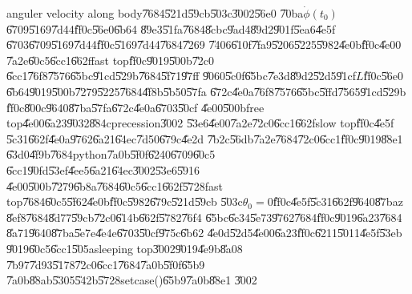 anguler velocity along body\U{7684}\U{521d}\U{59cb}\U{503c}\U{3002}\U{56e0}%
\U{70ba}$\dot{\phi}(t_{0})$\U{6709}\U{5169}\U{7d44}\U{ff0c}\U{56e0}\U{6b64}%
\U{89e3}\U{51fa}\U{7684}\U{8cbc}\U{9ad4}\U{89d2}\U{901f}\U{5ea6}\U{4e5f}%
\U{6703}\U{6709}\U{5169}\U{7d44}\U{ff0c}\U{5169}\U{7d44}\U{7684}\U{7269}%
\U{7406}\U{610f}\U{7fa9}\U{5206}\U{5225}\U{5982}\U{4e0b}\U{ff0c}\U{4e00}%
\U{7a2e}\U{60c5}\U{6cc1}\U{662f}fast top\U{ff0c}\U{9019}\U{500b}\U{72c0}%
\U{6cc1}\U{76f8}\U{7576}\U{65bc}\U{91cd}\U{529b}\U{7684}\U{5f71}\U{97ff}%
\U{9060}\U{5c0f}\U{65bc}\U{7e3d}\U{89d2}\U{52d5}\U{91cf}$L$\U{ff0c}\U{56e0}%
\U{6b64}\U{9019}\U{500b}\U{7279}\U{5225}\U{7684}\U{4f8b}\U{5b50}\U{57fa}%
\U{672c}\U{4e0a}\U{76f8}\U{7576}\U{65bc}\U{5ffd}\U{7565}\U{91cd}\U{529b}%
\U{ff0c}\U{800c}\U{9640}\U{87ba}\U{57fa}\U{672c}\U{4e0a}\U{6703}\U{50cf}%
\U{4e00}\U{500b}free top\U{4e00}\U{6a23}\U{9032}\U{884c}precession\U{3002}%
\U{53e6}\U{4e00}\U{7a2e}\U{72c0}\U{6cc1}\U{662f}slow top\U{ff0c}\U{4e5f}%
\U{5c31}\U{662f}\U{4e0a}\U{9762}\U{6a21}\U{64ec}\U{7d50}\U{679c}\U{4e2d}%
\U{7b2c}\U{56db}\U{7a2e}\U{7684}\U{72c0}\U{6cc1}\U{ff0c}\U{9019}\U{88e1}%
\U{63d0}\U{4f9b}\U{7684}python\U{7a0b}\U{5f0f}\U{6240}\U{6709}\U{60c5}%
\U{6cc1}\U{90fd}\U{53ef}\U{4ee5}\U{6a21}\U{64ec}\U{3002}\U{53e6}\U{5916}%
\U{4e00}\U{500b}\U{7279}\U{6b8a}\U{7684}\U{60c5}\U{6cc1}\U{662f}\U{5728}fast
top\U{7684}\U{60c5}\U{5f62}\U{4e0b}\U{ff0c}\U{5982}\U{679c}\U{521d}\U{59cb}%
\U{503c}$\theta _{0}=0$\U{ff0c}\U{4e5f}\U{5c31}\U{662f}\U{9640}\U{87ba}z%
\U{8ef8}\U{7684}\U{8d77}\U{59cb}\U{72c0}\U{614b}\U{662f}\U{5782}\U{76f4}%
\U{65bc}\U{6c34}\U{5e73}\U{9762}\U{7684}\U{ff0c}\U{9019}\U{6a23}\U{7684}%
\U{8a71}\U{9640}\U{87ba}\U{5e7e}\U{4e4e}\U{6703}\U{50cf}\U{975c}\U{6b62}%
\U{4e0d}\U{52d5}\U{4e00}\U{6a23}\U{ff0c}\U{6211}\U{5011}\U{4e5f}\U{53eb}%
\U{9019}\U{60c5}\U{6cc1}\U{505a}sleeping top\U{3002}\U{9019}\U{4e9b}\U{8a08}%
\U{7b97}\U{7d93}\U{5178}\U{72c0}\U{6cc1}\U{7684}\U{7a0b}\U{5f0f}\U{65b9}%
\U{7a0b}\U{88ab}\U{5305}\U{542b}\U{5728}setcase()\U{65b9}\U{7a0b}\U{88e1}%
\U{3002}

\setcounter{page}{1}

